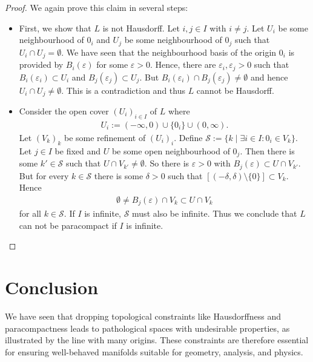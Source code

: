 \documentclass[a4paper, 12pt]{article}
\theoremstyle{iremark}
\begin{document}
\begin{proof}
    We again prove this claim in several steps:
    \begin{itemize}
        \item First, we show that $L$ is not Hausdorff. Let $i, j\in I$ with $i\neq j$. Let $U_i$ be some neighbourhood 
		of $0_i$ and $U_j$ be some neighbourhood of $0_j$ such that $U_i\cap U_j = \emptyset$. 
		We have seen that the neighbourhood basis of the origin $0_i$ is provided by $B_i(\varepsilon)$ 
		for some $\varepsilon>0$. Hence, there are $\varepsilon_i, \varepsilon_j> 0$ such 
		that $B_i(\varepsilon_i)\subset U_i$ and $B_j(\varepsilon_j)\subset U_j$. 
		But $B_i(\varepsilon_i)\cap B_j(\varepsilon_j)\neq\emptyset$ and hence $U_i\cap U_j\neq\emptyset$. 
		This is a contradiction and thus $L$ cannot be Hausdorff.
        \item Consider the open cover $(U_i)_{i\in I}$ of $L$ where
        \begin{align*}
            U_i := (-\infty,0)\cup\{0_i\}\cup(0,\infty).
        \end{align*}
        Let $(V_k)_{k}$ be some refinement of $(U_i)_i$. 
	Define $\mathcal{S}:= \{k\mid\exists i\in I: 0_i\in V_k\}$. Let $j\in I$ be fixed 
	and $U$ be some open neighbourhood of $0_j$. Then there is some $k'\in\mathcal{S}$ such 
	that $U\cap V_{k'}\neq\emptyset$. So there is $\varepsilon>0$ with $B_j(\varepsilon)\subset U\cap V_{k'}$. 
	But for every $k\in\mathcal{S}$ there is some $\delta>0$ such that $[(-\delta,\delta)\setminus\{0\}]\subset V_k$. 
	Hence 
        \begin{align*}
            \emptyset\neq B_j(\varepsilon)\cap V_k\subset U\cap V_k
        \end{align*}
        for all $k\in\mathcal{S}$. If $I$ is infinite, $\mathcal{S}$ must also be infinite. 
	Thus we conclude that $L$ can not be paracompact if $I$ is infinite.
    \end{itemize}
\end{proof}
\section{Conclusion}
We have seen that dropping topological constraints like Hausdorffness and paracompactness leads to pathological spaces with 
undesirable properties, as illustrated by the line with many origins. These constraints are therefore essential for ensuring 
well-behaved manifolds suitable for geometry, analysis, and physics.
\printbibliography
\end{document}
